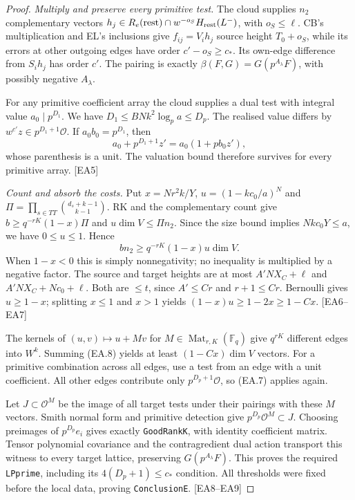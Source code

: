 \documentclass[11pt,a4paper]{article}
\numberwithin{equation}{section}
\theoremstyle{remark}\newtheorem{remark}[theorem]{Remark}
\begin{document}
\begin{proof}
\emph{Multiply and preserve every primitive test.}
The cloud supplies $n_2$ complementary vectors
$h_j\in R_e(\mathrm{rest})\cap w^{-o_S}H_{\rm rest}(L^-)$,
with $o_S\le\ell$. CB's multiplication and EL's inclusions give
$f_{ij}=V_ih_j$ source height $T_0+o_S$, while its errors at other outgoing
edges have order $c'-o_S\ge c_*$. Its own-edge difference from $S_ih_j$
has order $c'$. The pairing is exactly
$\beta(F,G)=G(p^{A_\lambda}F)$, with possibly negative $A_\lambda$.

For any primitive coefficient array the cloud supplies a dual test with
integral value $a_0\mid p^{D_1}$. We have
$D_1\le BNk^2\log_p a\le D_p$. The realised value differs by
$w^{c'}z\in p^{D_1+1}\mathcal O$. If $a_0b_0=p^{D_1}$, then
\[
 a_0+p^{D_1+1}z'=a_0(1+pb_0z'),
 \tag{EA.7}
\]
whose parenthesis is a unit. The valuation bound therefore survives for
every primitive array. \textsf{[EA5]}

\emph{Count and absorb the costs.}
Put $x=Nr^2k/Y$, $u=(1-kc_0/a)^N$ and
$\Pi=\prod_{s\in TT}\binom{d_s+k-1}{k-1}$. RK and the complementary
count give $b\ge q^{-rK}(1-x)\Pi$ and $u\dim V\le\Pi n_2$.
Since the size bound implies $Nkc_0Y\le a$, we have $0\le u\le1$.
Hence
\[
 bn_2\ge q^{-rK}(1-x)u\dim V.
 \tag{EA.8}
\]
When $1-x<0$ this is simply nonnegativity; no inequality is multiplied by
a negative factor. The source and target heights are at most
$A'NX_C+\ell$ and $A'NX_C+Nc_0+\ell$. Both are $\le t$, since
$A'\le Cr$ and $r+1\le Cr$. Bernoulli gives $u\ge1-x$; splitting
$x\le1$ and $x>1$ yields $(1-x)u\ge1-2x\ge1-Cx$.
\textsf{[EA6--EA7]}

The kernels of $(u,v)\mapsto u+Mv$ for
$M\in\operatorname{Mat}_{r,K}(\mathbb F_q)$ give $q^{rK}$ different
edges into $W^k$. Summing (EA.8) yields at least $(1-Cx)\dim V$ vectors.
For a primitive combination across all edges, use a test from an edge
with a unit coefficient. All other edges contribute only
$p^{D_p+1}\mathcal O$, so (EA.7) applies again.

Let $J\subset\mathcal O^M$ be the image of all target tests under their
pairings with these $M$ vectors. Smith normal form and primitive detection
give $p^{D_p}\mathcal O^M\subset J$. Choosing preimages of
$p^{D_p}e_i$ gives exactly \texttt{GoodRankK}, with identity coefficient
matrix. Tensor polynomial covariance and the contragredient dual action
transport this witness to every target lattice, preserving
$G(p^{A_\lambda}F)$. This proves the required \texttt{LPprime}, including
its $4(D_p+1)\le c_*$ condition. All thresholds were fixed before the local
data, proving \texttt{ConclusionE}. \textsf{[EA8--EA9]}
\end{proof}
\end{document}
